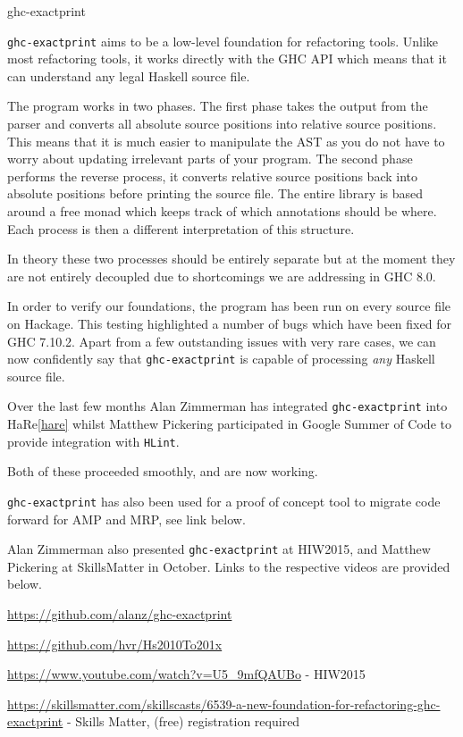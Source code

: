\documentclass[DIV16,twocolumn,10pt]{scrreprt}
\begin{document}
\begin{hcarentry}[new]{ghc-exactprint}
\makeheader

\texttt{ghc-exactprint} aims to be a low-level foundation for
refactoring tools. Unlike most refactoring tools, it works directly with
the GHC API which means that it can understand any legal Haskell source
file.

The program works in two phases. The first phase takes the output from
the parser and converts all absolute source positions into relative
source positions. This means that it is much easier to manipulate the
AST as you do not have to worry about updating irrelevant parts of your
program. The second phase performs the reverse process, it converts
relative source positions back into absolute positions before printing the
source file. The entire library is based around a free monad which keeps track
of which annotations should be where. Each process is then a different
interpretation of this structure.

In theory these two processes should be entirely separate but at the moment they
are not entirely decoupled due to shortcomings we are addressing in GHC 8.0.

In order to verify our foundations, the program has been run on every
source file on Hackage. This testing highlighted a number of bugs which
have been fixed for GHC 7.10.2. Apart from a few outstanding issues with
very rare cases, we can now confidently say that \texttt{ghc-exactprint}
is capable of processing \emph{any} Haskell source file.

Over the last few months Alan Zimmerman has integrated \texttt{ghc-exactprint}
into HaRe\cref{hare} whilst Matthew Pickering participated in Google Summer of
Code to provide integration with \texttt{HLint}.

Both of these proceeded smoothly, and are now working.

\texttt{ghc-exactprint} has also been used for a proof of concept tool to
migrate code forward for AMP and MRP, see link below.

Alan Zimmerman also presented \texttt{ghc-exactprint} at HIW2015, and Matthew
Pickering at SkillsMatter in October. Links to the respective videos are
provided below.

\FurtherReading
\begin{compactitem}
  \item \url{https://github.com/alanz/ghc-exactprint}
  \item \url{https://github.com/hvr/Hs2010To201x}
  \item \url{https://www.youtube.com/watch?v=U5_9mfQAUBo} - HIW2015
  \item
    \url{https://skillsmatter.com/skillscasts/6539-a-new-foundation-for-refactoring-ghc-exactprint}
    - Skills Matter, (free) registration required
\end{compactitem}
\end{hcarentry}
\end{document}
